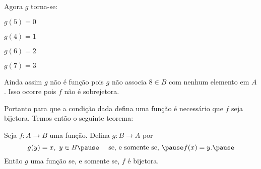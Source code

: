 \documentclass{beamer}
\begin{document}
    \begin{frame}
        Agora $g$ torna-se:\pause
        \begin{center}
            $g(5) = 0$\pause\\

            \vspace{.3cm}

            $g(4) = 1$\pause\\

            \vspace{.3cm}

            $g(6) = 2$\\

            \vspace{.3cm}

            $g(7) = 3$\pause
        \end{center}

        Ainda assim $g$ n\~ao \'e fun\c{c}\~ao \pause pois $g$ n\~ao associa $8 \in B$ \pause com nenhum elemento em $A$.  Isso ocorre pois \pause $f$ n\~ao \'e sobrejetora.\pause

        \vspace{.3cm}

        Portanto para que a condi\c{c}\~ao dada \pause defina uma fun\c{c}\~ao \pause \'e necess\'ario que $f$ seja bijetora. \pause Temos ent\~ao o seguinte teorema:
    \end{frame}

    \begin{frame}
        \begin{teorema}
            Seja $f: A \to B$ uma fun{\c c}{\~a}o. \pause Defina $g : B \to A$ \pause por\pause
            \[
                g(y) = x,\ y \in B \pause \quad \mbox{ se, e somente se, } \pause f(x) = y.\pause
            \]
            Ent{\~a}o $g$  uma fun{\c c}{\~a}o \pause se, e somente se, \pause $f$ {\'e} bijetora.
        \end{teorema}
    \end{frame}
\end{document}
